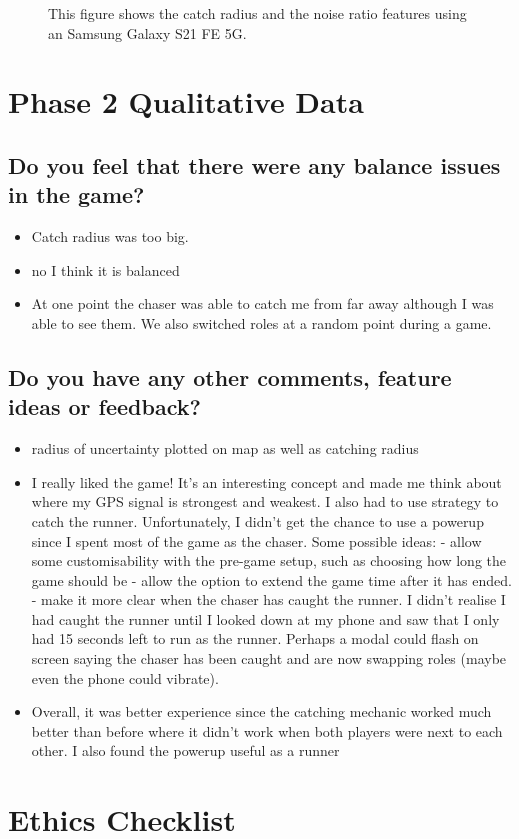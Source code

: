 \documentclass{l4proj}
\begin{document}
\begin{appendices}
\begin{figure}
    \caption{This figure shows the catch radius and the noise ratio features using an Samsung Galaxy S21 FE 5G.
    }
    \label{fig:s21noiseandcatch}
\end{figure}

\chapter{Phase 2 Qualitative Data}

\section{Do you feel that there were any balance issues in the game?}
\label{phase2balance}

\begin{itemize}
    \item Catch radius was too big.
    \item no I think it is balanced
    \item At one point the chaser was able to catch me from far away although I was able to see them. We also switched roles at a random point during a game.
\end{itemize}

\section{Do you have any other comments, feature ideas or feedback?}
\label{phase2generalfeedback}

\begin{itemize}
    \item radius of uncertainty plotted on map as well as catching radius
    \item I really liked the game! It's an interesting concept and made me think about where my GPS signal is strongest and weakest. I also had to use strategy to catch the runner. Unfortunately, I didn't get the chance to use a powerup since I spent most of the game as the chaser. Some possible ideas: - allow some customisability with the pre-game setup, such as choosing how long the game should be - allow the option to extend the game time after it has ended. - make it more clear when the chaser has caught the runner. I didn't realise I had caught the runner until I looked down at my phone and saw that I only had 15 seconds left to run as the runner. Perhaps a modal could flash on screen saying the chaser has been caught and are now swapping roles (maybe even the phone could vibrate).
    \item Overall, it was better experience since the catching mechanic worked much better than before where it didn't work when both players were next to each other. I also found the powerup useful as a runner
\end{itemize}

\chapter{Ethics Checklist}




\end{appendices}
\end{document}

